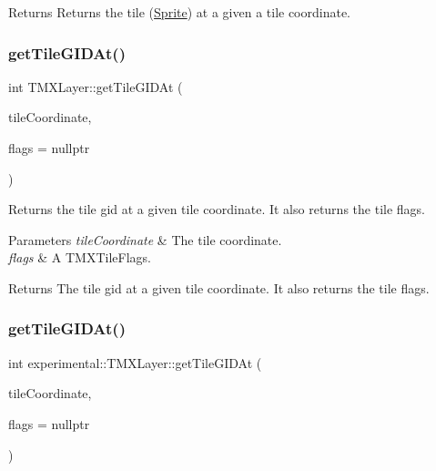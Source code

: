 \begin{DoxyReturn}{Returns}
Returns the tile (\hyperlink{classSprite}{Sprite}) at a given a tile coordinate. 
\end{DoxyReturn}
\mbox{\label{classexperimental_1_1TMXLayer_a29a706881c6f684bd3876ee983bc7bbe}} 
\subsubsection{\texorpdfstring{get\+Tile\+G\+I\+D\+At()}{getTileGIDAt()}\hspace{0.1cm}{\footnotesize\ttfamily [1/2]}}
{\footnotesize\ttfamily int T\+M\+X\+Layer\+::get\+Tile\+G\+I\+D\+At (\begin{DoxyParamCaption}\item[{const \hyperlink{classVec2}{Vec2} \&}]{tile\+Coordinate,  }\item[{T\+M\+X\+Tile\+Flags $\ast$}]{flags = {\ttfamily nullptr} }\end{DoxyParamCaption})}

Returns the tile gid at a given tile coordinate. It also returns the tile flags.


\begin{DoxyParams}{Parameters}
{\em tile\+Coordinate} & The tile coordinate. \\
\hline
{\em flags} & A T\+M\+X\+Tile\+Flags. \\
\hline
\end{DoxyParams}
\begin{DoxyReturn}{Returns}
The tile gid at a given tile coordinate. It also returns the tile flags. 
\end{DoxyReturn}
\mbox{\label{classexperimental_1_1TMXLayer_a945cd3f3f69a23be9123150ab6411bd8}} 
\subsubsection{\texorpdfstring{get\+Tile\+G\+I\+D\+At()}{getTileGIDAt()}\hspace{0.1cm}{\footnotesize\ttfamily [2/2]}}
{\footnotesize\ttfamily int experimental\+::\+T\+M\+X\+Layer\+::get\+Tile\+G\+I\+D\+At (\begin{DoxyParamCaption}\item[{const \hyperlink{classVec2}{Vec2} \&}]{tile\+Coordinate,  }\item[{T\+M\+X\+Tile\+Flags $\ast$}]{flags = {\ttfamily nullptr} }\end{DoxyParamCaption})}

